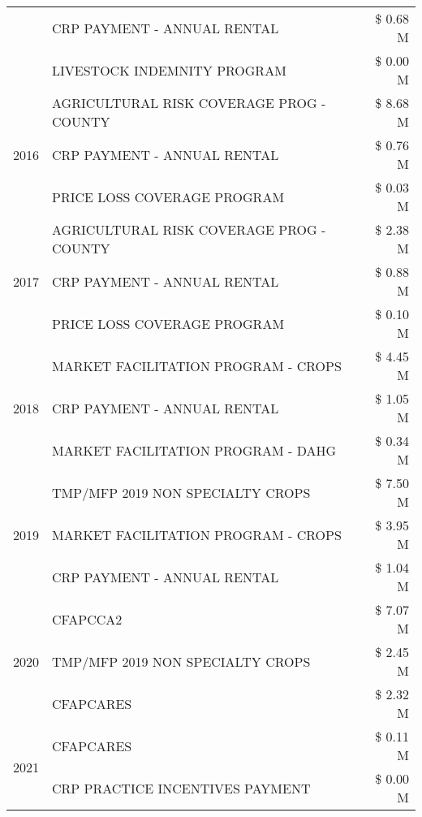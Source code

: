 \begin{tabular}{llr}
 & CRP PAYMENT - ANNUAL RENTAL & \$ 0.68 M \\
 & LIVESTOCK INDEMNITY PROGRAM & \$ 0.00 M \\
\cline{1-3}
\multirow[t]{3}{*}{2016} & AGRICULTURAL RISK COVERAGE PROG - COUNTY      & \$ 8.68 M \\
 & CRP PAYMENT - ANNUAL RENTAL                   & \$ 0.76 M \\
 & PRICE LOSS COVERAGE PROGRAM                   & \$ 0.03 M \\
\cline{1-3}
\multirow[t]{3}{*}{2017} & AGRICULTURAL RISK COVERAGE PROG - COUNTY & \$ 2.38 M \\
 & CRP PAYMENT - ANNUAL RENTAL & \$ 0.88 M \\
 & PRICE LOSS COVERAGE PROGRAM & \$ 0.10 M \\
\cline{1-3}
\multirow[t]{3}{*}{2018} & MARKET FACILITATION PROGRAM - CROPS & \$ 4.45 M \\
 & CRP PAYMENT - ANNUAL RENTAL & \$ 1.05 M \\
 & MARKET FACILITATION PROGRAM - DAHG & \$ 0.34 M \\
\cline{1-3}
\multirow[t]{3}{*}{2019} & TMP/MFP 2019 NON SPECIALTY CROPS & \$ 7.50 M \\
 & MARKET FACILITATION PROGRAM - CROPS & \$ 3.95 M \\
 & CRP PAYMENT - ANNUAL RENTAL & \$ 1.04 M \\
\cline{1-3}
\multirow[t]{3}{*}{2020} & CFAPCCA2 & \$ 7.07 M \\
 & TMP/MFP 2019 NON SPECIALTY CROPS & \$ 2.45 M \\
 & CFAPCARES & \$ 2.32 M \\
\cline{1-3}
\multirow[t]{2}{*}{2021} & CFAPCARES & \$ 0.11 M \\
 & CRP PRACTICE INCENTIVES PAYMENT & \$ 0.00 M \\
\cline{1-3}
\bottomrule
\end{tabular}
